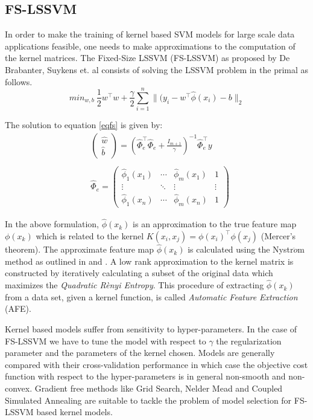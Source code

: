 \documentclass[conference, cmex10]{IEEEtran}
\begin{document}
\subsection{FS-LSSVM}
In order to make the training of kernel based SVM models for large scale data applications feasible, one needs to make approximations to the computation of the kernel matrices. The Fixed-Size LSSVM (FS-LSSVM) as proposed by De Brabanter, Suykens et. al \cite{DeBrabanter2010} consists of solving the LSSVM problem in the primal as follows.
\begin{equation}
\label{eqfs}
min_{w,b} \ \frac{1}{2}w^{\intercal} w + \frac{\gamma}{2}\sum^{n}_{i=1} \|(y_{i} - w^{\intercal} \hat{\phi}(x_i) - b\|_{2} 
\end{equation}

The solution to equation \ref{eqfs} is given by:
\begin{align*}
\label{eqfssol}
& \left( \begin{matrix}
\hat{w}\\ 
\hat{b}
\end{matrix}\right ) = 
\left ( \hat{\Phi}^{\intercal}_e \hat{\Phi}_e + \frac{\mathit{I}_{m+1}}{\gamma} \right )^{-1} \hat{\Phi}^{\intercal}_e y
\\ \\
& \hat{\Phi}_e = \begin{pmatrix}
\hat{\phi}_{1}(x_1) & \cdots & \hat{\phi}_{m}(x_1) & 1\\ 
\vdots &  \ddots & \vdots & \vdots\\ 
\hat{\phi}_{1}(x_n) & \cdots & \hat{\phi}_{m}(x_n) & 1
\end{pmatrix}
\end{align*}

In the above formulation, $\hat{\phi}(x_k)$ is an approximation to the true feature map $\phi(x_k)$ which is related to the kernel $K(x_i, x_j) = \phi(x_i)^{\intercal} \phi(x_j)$ (Mercer's theorem). The approximate feature map $\hat{\phi}(x_k)$ is calculated using the Nystr$\ddot{o}$m method as outlined in \cite{DeBrabanter2010,Mall2015} and \cite{Mall2013}. A low rank approximation to the kernel matrix is constructed by iteratively calculating a subset of the original data which maximizes the \textit{Quadratic R\`enyi Entropy}. This procedure of extracting $\hat{\phi}(x_k)$ from a data set, given a kernel function, is called \textit{Automatic Feature Extraction} (AFE).

Kernel based models suffer from sensitivity to hyper-parameters. In the case of FS-LSSVM we have to tune the model with respect to $\gamma$ the regularization parameter and the parameters of the kernel chosen. Models are generally compared with their cross-validation performance in which case the objective cost function with respect to the hyper-parameters is in general non-smooth and non-convex. Gradient free methods like Grid Search, Nelder Mead \cite{Nelder1965} and Coupled Simulated Annealing \cite{Xavier-De-Souza2010} are suitable to tackle the problem of model selection for FS-LSSVM based kernel models.
\end{document}
